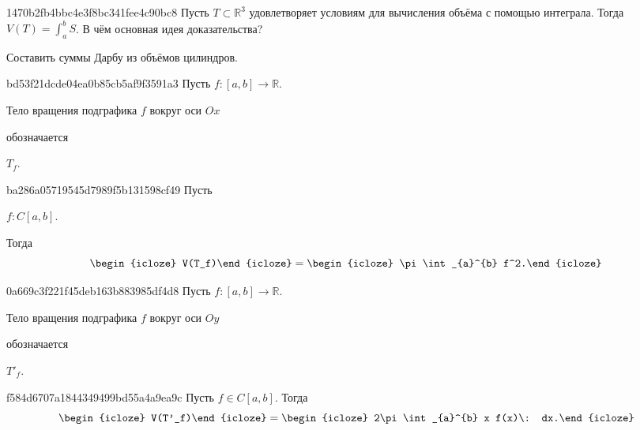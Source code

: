 \begin{note}{1470b2fb4bbc4e3f8bc341fee4c90bc8}
    Пусть \({ T \subset \mathbb R^3 }\) удовлетворяет условиям для вычисления объёма с помощью интеграла.
    Тогда \({ V(T) = \int_{a}^{b} S }\).
    В чём основная идея доказательства?

    \begin{cloze}{1}
        Составить суммы Дарбу из объёмов цилиндров.
    \end{cloze}
\end{note}

\begin{note}{bd53f21dcde04ea0b85cb5af9f3591a3}
    Пусть \({ f : [a, b] \to \mathbb R }\).
    \begin{icloze}{2}Тело вращения подграфика \({ f }\) вокруг оси \({ Ox }\)\end{icloze} обозначается \begin{icloze}{1}\({ T_f }\).\end{icloze}
\end{note}

\begin{note}{ba286a05719545d7989f5b131598cf49}
    Пусть \begin{icloze}{3}\({ f : C[a, b] }\).\end{icloze}
    Тогда
    \[
        \begin{icloze}{2}V(T_f)\end{icloze} = \begin{icloze}{1}\pi \int_{a}^{b} f^2.\end{icloze}
    \]
\end{note}

\begin{note}{0a669c3f221f45deb163b883985df4d8}
    Пусть \({ f : [a, b] \to \mathbb R }\).
    \begin{icloze}{2}Тело вращения подграфика \({ f }\) вокруг оси \({ Oy }\)\end{icloze} обозначается \begin{icloze}{1}\({ T'_f }\).\end{icloze}
\end{note}

\begin{note}{f584d6707a1844349499bd55a4a9ea9c}
    Пусть \({ f \in C[a, b] }\).
    Тогда
    \[
        \begin{icloze}{2}V(T'_f)\end{icloze} = \begin{icloze}{1}2\pi \int_{a}^{b} x f(x)\: dx.\end{icloze}
    \]
\end{note}

